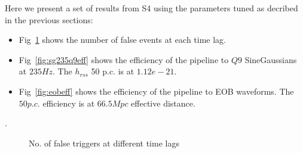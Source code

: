 \documentclass{article}
\begin{document}
Here we present a set of results from S4 using the parameters tuned
as decribed in the previous sections:
\begin{itemize}
\item Fig~\ref{fig:eventsvstimelag} shows the number of false events 
at each time lag.
\item Fig~\ref{fig:sg235q9eff} shows the efficiency of the pipeline to 
$Q9$ SineGaussians at $235 Hz$. The $h_{rss}$ 50 p.c. is at $1.12e-21$.
\item Fig~\ref{fig:eobeff} shows the efficiency of the pipeline to 
EOB waveforms. The $50 p.c.$ efficiency is at $66.5 Mpc$ effective distance.   
\end{itemize}.
\begin{figure}
\begin{center}
\caption{No. of false triggers at different time lags}
\label{fig:eventsvstimelag}
\end{center}
\end{figure}
\end{document}
